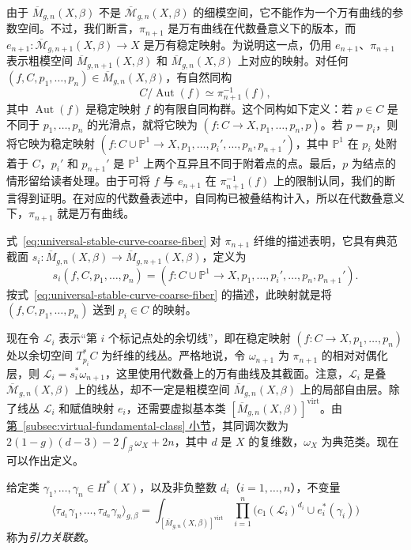 由于 $\overline M_{g,n}(X,\beta)$ 不是 $\overline{\mathcal M}_{g,n}(X,\beta)$ 的细模空间，它不能作为一个万有曲线的参数空间。不过，我们断言，$\pi_{n+1}$ 是万有曲线在代数叠意义下的版本，而 $e_{n+1}:\overline{\mathcal M}_{g,n+1}(X,\beta)\to X$ 是万有稳定映射。为说明这一点，仍用 $e_{n+1}$、$\pi_{n+1}$ 表示粗模空间 $\overline M_{g,n+1}(X,\beta)$
和 $\overline M_{g,n}(X,\beta)$ 上对应的映射。对任何 $(f,C,p_1,\ldots,p_n)\in\overline M_{g,n}(X,\beta)$，有自然同构
\begin{equation}\label{eq:universal-stable-curve-coarse-fiber}
C/\operatorname{Aut}(f)\simeq\pi_{n+1}^{-1}(f),
\end{equation}
其中 $\operatorname{Aut}(f)$ 是稳定映射 $f$ 的有限自同构群。这个同构如下定义：若 $p\in C$ 是不同于 $p_1,\ldots,p_n$ 的光滑点，就将它映为 $(f:C\to X,p_1,\ldots,p_n,p)$。若 $p=p_i$，则将它映为稳定映射 $(f:C\cup\mathbb P^1\to X,p_1,\ldots,p_i',\ldots,p_n,p_{n+1}')$，其中 $\mathbb P^1$ 在 $p_i$ 处附着于 $C$，$p_i'$ 和 $p_{n+1}'$ 是 $\mathbb P^1$ 上两个互异且不同于附着点的点。最后，$p$ 为结点的情形留给读者处理。由于可将 $f$ 与 $e_{n+1}$ 在 $\pi_{n+1}^{-1}(f)$ 上的限制认同，我们的断言得到证明。在对应的代数叠表述中，自同构已被叠结构计入，所以在代数叠意义下，$\pi_{n+1}$ 就是万有曲线。

式~\eqref{eq:universal-stable-curve-coarse-fiber} 对 $\pi_{n+1}$ 纤维的描述表明，它具有典范截面 $s_i:\overline M_{g,n}(X,\beta)\to\overline M_{g,n+1}(X,\beta)$，定义为
\[
s_i(f,C,p_1,\ldots,p_n)
=(f:C\cup\mathbb P^1\to X,p_1,\ldots,p_i',\ldots,p_n,p_{n+1}').
\]
按式~\eqref{eq:universal-stable-curve-coarse-fiber} 的描述，此映射就是将 $(f,C,p_1,\ldots,p_n)$ 送到 $p_i\in C$ 的映射。

现在令 $\mathcal L_i$ 表示“第 $i$ 个标记点处的余切线”，即在稳定映射 $(f:C\to X,p_1,\ldots,p_n)$ 处以余切空间 $T_{p_i}^*C$ 为纤维的线丛。严格地说，令 $\omega_{n+1}$ 为 $\pi_{n+1}$ 的相对对偶化层，则 $\mathcal L_i=s_i^*\omega_{n+1}$，这里使用代数叠上的万有曲线及其截面。注意，$\mathcal L_i$ 是叠 $\overline{\mathcal M}_{g,n}(X,\beta)$ 上的线丛，却不一定是粗模空间 $\overline M_{g,n}(X,\beta)$ 上的局部自由层。除了线丛 $\mathcal L_i$ 和赋值映射 $e_i$，还需要虚拟基本类 $[\overline M_{g,n}(X,\beta)]^{\mathrm{virt}}$。由\hyperref[subsec:virtual-fundamental-class]{第~\ref*{subsec:virtual-fundamental-class} 小节}，其同调次数为 $2(1-g)(d-3)-2\int_\beta\omega_X+2n$，其中 $d$ 是 $X$ 的复维数，$\omega_X$ 为典范类。现在可以作出定义。
\begin{definition}\label{def:gravitational-correlator}
给定类 $\gamma_1,\ldots,\gamma_n\in H^*(X)$，以及非负整数 $d_i$（$i=1,\ldots,n$），不变量
\[
\langle\tau_{d_1}\gamma_1,\ldots,\tau_{d_n}\gamma_n\rangle_{g,\beta}
=\int_{[\overline M_{g,n}(X,\beta)]^{\mathrm{virt}}}
\prod_{i=1}^n\bigl(c_1(\mathcal L_i)^{d_i}\cup e_i^*(\gamma_i)\bigr)
\]
称为\emph{引力关联数}。
\end{definition}

